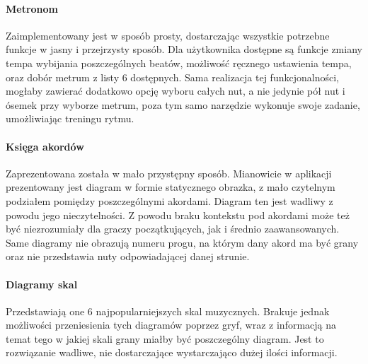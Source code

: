 \paragraph{Metronom}
Zaimplementowany jest w sposób prosty, dostarczając wszystkie potrzebne funkcje w jasny i przejrzysty sposób. Dla użytkownika dostępne są funkcje zmiany tempa wybijania poszczególnych beatów, możliwość ręcznego ustawienia tempa, oraz dobór metrum z listy 6 dostępnych. Sama realizacja tej funkcjonalności, mogłaby zawierać dodatkowo opcję wyboru całych nut, a nie jedynie pół nut i ósemek przy wyborze metrum, poza tym samo narzędzie wykonuje swoje zadanie, umożliwiając treningu rytmu.

\paragraph{Księga akordów}
Zaprezentowana została w mało przystępny sposób. Mianowicie w aplikacji prezentowany jest diagram w formie statycznego obrazka, z mało czytelnym podziałem pomiędzy poszczególnymi akordami. Diagram ten jest wadliwy z powodu jego nieczytelności. Z powodu braku kontekstu pod akordami może też być niezrozumiały dla graczy początkujących, jak i średnio zaawansowanych. Same diagramy nie obrazują numeru progu, na którym dany akord ma być grany oraz nie przedstawia nuty odpowiadającej danej strunie.

\paragraph{Diagramy skal}
Przedstawiają one 6 najpopularniejszych skal muzycznych. Brakuje jednak możliwości przeniesienia tych diagramów poprzez gryf, wraz z informacją na temat tego w jakiej skali grany miałby być poszczególny diagram. Jest to rozwiązanie wadliwe, nie dostarczające wystarczająco dużej ilości informacji. \\


